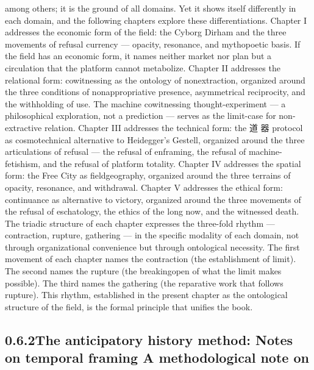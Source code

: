 among others; it is the ground of all domains. Yet it shows itself differently in each domain, and the following chapters explore these differentiations. Chapter I addresses the economic form of the field: the Cyborg Dirham and the three movements of refusal currency — opacity, resonance, and mythopoetic basis. If the field has an economic form, it names neither market nor plan but a circulation that the platform cannot metabolize. Chapter II addresses the relational form: cowitnessing as the ontology of nonextraction, organized around the three conditions of nonappropriative presence, asymmetrical reciprocity, and the withholding of use. The machine cowitnessing thought-experiment — a philosophical exploration, not a prediction — serves as the limit-case for non-extractive relation. Chapter III addresses the technical form: the 道 器 protocol as cosmotechnical alternative to Heidegger’s Gestell, organized around the three articulations of refusal — the refusal of enframing, the refusal of machine-fetishism, and the refusal of platform totality. Chapter IV addresses the spatial form: the Free City as fieldgeography, organized around the three terrains of opacity, resonance, and withdrawal. Chapter V addresses the ethical form: continuance as alternative to victory, organized around the three movements of the refusal of eschatology, the ethics of the long now, and the witnessed death. The triadic structure of each chapter expresses the three-fold rhythm — contraction, rupture, gathering — in the specific modality of each domain, not through organizational convenience but through ontological necessity. The first movement of each chapter names the contraction (the establishment of limit). The second names the rupture (the breakingopen of what the limit makes possible). The third names the gathering (the reparative work that follows rupture). This rhythm, established in the present chapter as the ontological structure of the field, is the formal principle that unifies the book.

\subsection{0.6.2\quad The anticipatory history method: Notes on temporal framing A methodological note on}

